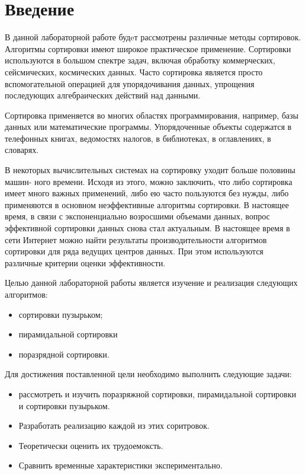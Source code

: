 \tableofcontents{}


\chapter{Введение}
\label{cha:appendix2}

В данной лабораторной работе будeт рассмотрены различные методы сортировок. Алгоритмы сортировки имеют широкое практическое применение. Сортировки используются в большом спектре задач, включая обработку коммерческих, сейсмических, космических данных. Часто сортировка является просто вспомогательной операцией для упорядочивания данных, упрощения последующих алгебраических действий над данными. 

Сортировка применяется во многих областях программирования, например, базы данных или математические программы. Упорядоченные объекты содержатся в телефонных книгах, ведомостях налогов, в библиотеках, в оглавлениях, в словарях. 

В некоторых вычислительных системах на сортировку уходит больше половины машин- ного времени. Исходя из этого, можно заключить, что либо сортировка имеет много важных применений, либо ею часто пользуются без нужды, либо применяются в основном неэффективные алгоритмы сортировки. В настоящее время, в связи с экспоненциально возросшими объемами данных, вопрос эффективной сортировки данных снова стал актуальным. 
В настоящее время в сети Интернет можно найти результаты производительности алгоритмов сортировки для ряда ведущих центров данных. При этом используются различные критерии оценки эффективности.

Целью данной лабораторной работы является изучение и реализация следующих алгоритмов: 
\begin{itemize}
    \item сортировки пузырьком;
    \item пирамидальной сортировки
    \item поразрядной сортировки.
\end{itemize}

Для достижения поставленной цели необходимо выполнить следующие задачи: 
\begin{itemize}
    \item рассмотреть и изучить поразряжной сортировки, пирамидальной сортировки и сортировки пузырьком.
    \item Разработать реализацию каждой из этих соритровок.
    \item Теоретически оценить их трудоемоксть.
    \item Сравнить временные характеристики экспериментально.
\end{itemize}
